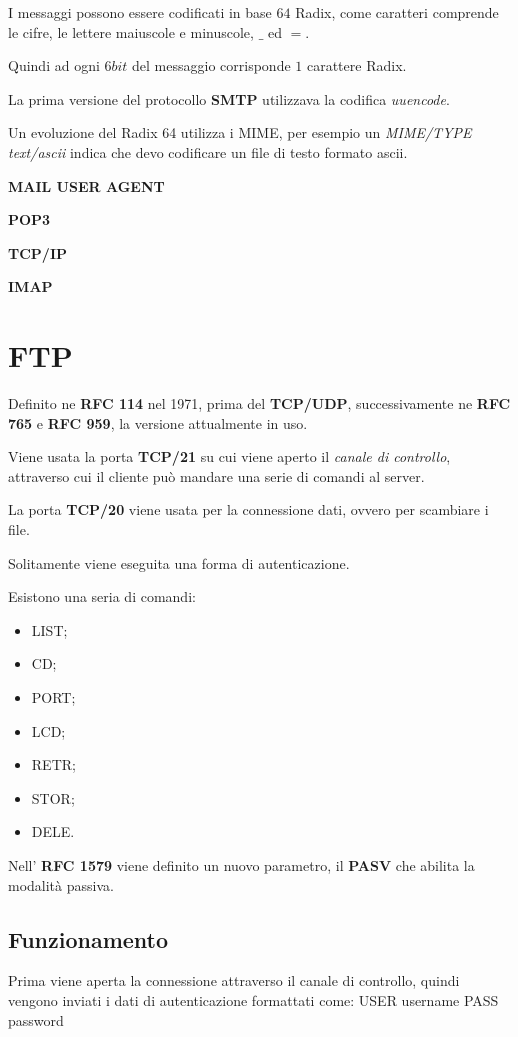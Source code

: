 I messaggi possono essere codificati in base $64$ Radix, come caratteri
comprende le cifre, le lettere maiuscole e minuscole, $\_$ ed $=$.

Quindi ad ogni $6bit$ del messaggio corrisponde $1$ carattere Radix.

La prima versione del protocollo \textbf{SMTP} utilizzava la codifica \emph{
uuencode}.


Un evoluzione del Radix 64 utilizza i MIME, per esempio un \emph{MIME/TYPE}
\emph{text/ascii} indica che devo codificare un file di testo formato ascii.

\textbf{MAIL USER AGENT}

\textbf{POP3}

\textbf{TCP/IP}

\textbf{IMAP}

\section{FTP}
Definito ne \textbf{RFC 114} nel 1971, prima del \textbf{TCP/UDP},
successivamente ne \textbf{RFC 765} e \textbf{RFC 959}, la versione
attualmente in uso.

Viene usata la porta \textbf{TCP/21} su cui viene aperto il \emph{canale di
controllo}, attraverso cui il cliente può mandare una serie di comandi al
server.

La porta \textbf{TCP/20} viene usata per la connessione dati, ovvero per
scambiare i file.

Solitamente viene eseguita una forma di autenticazione.

Esistono una seria di comandi:
\begin{itemize}
  \item LIST;
  \item CD;
  \item PORT;
  \item LCD;
  \item RETR;
  \item STOR;
  \item DELE.
\end{itemize}

Nell' \textbf{RFC 1579} viene definito un nuovo parametro, il \textbf{PASV}
che abilita la modalità passiva.

\subsection{Funzionamento}
Prima viene aperta la connessione attraverso il canale di controllo, quindi
vengono inviati i dati di autenticazione formattati come:\newline
USER username\newline
PASS password\newline

